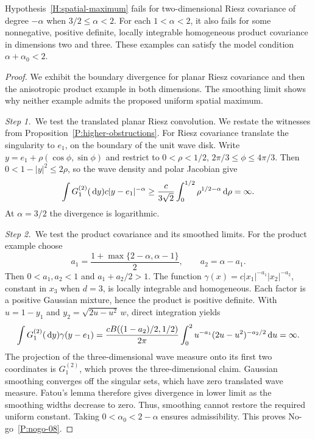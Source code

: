 \setcounter{nogo}{7}
\begin{nogo}\label{P:nogo-08}
  Hypothesis~\ref{H:spatial-maximum} fails for two-dimensional Riesz
  covariance of degree $-\alpha$ when $3/2\le\alpha<2$. For each
  $1<\alpha<2$, it also fails for some nonnegative, positive definite,
  locally integrable homogeneous product covariance in dimensions two
  and three. These examples can satisfy the model condition
  $\alpha+\alpha_0<2$.
\end{nogo}
\begin{proof}
  We exhibit the boundary divergence for planar Riesz covariance and then the
  anisotropic product example in both dimensions. The smoothing limit shows
  why neither example admits the proposed uniform spatial maximum.


  \medskip
  \noindent\textit{Step 1.~}We test the translated planar Riesz convolution.
  We restate the witnesses from Proposition~\ref{P:higher-obstructions}.
  For Riesz covariance translate the singularity to $e_1$, on the boundary
  of the unit wave disk. Write $y=e_1+\rho(\cos\phi,\sin\phi)$ and restrict
  to $0<\rho<1/2$, $2\pi/3\le\phi\le4\pi/3$. Then
  $0<1-|y|^2\le2\rho$, so the wave density and polar Jacobian give
  \[
    \int G_1^{(2)}(\,\mathrm{d} y)c|y-e_1|^{-\alpha}
    \ge \frac{c}{3\sqrt2}\int_0^{1/2}\rho^{1/2-\alpha}\,\mathrm{d}\rho
    =\infty.
  \]
  At $\alpha=3/2$ the divergence is logarithmic.


  \medskip
  \noindent\textit{Step 2.~}We test the product covariance and its smoothed
  limits.
  For the product example choose
  \[
    a_1=\frac{1+\max\{2-\alpha,\alpha-1\}}2,
    \qquad a_2=\alpha-a_1.
  \]
  Then $0<a_1,a_2<1$ and $a_1+a_2/2>1$. The function
  $\gamma(x)=c|x_1|^{-a_1}|x_2|^{-a_2}$, constant in $x_3$ when $d=3$,
  is locally integrable and homogeneous. Each factor is a positive
  Gaussian mixture, hence the product is positive definite. With
  $u=1-y_1$ and $y_2=\sqrt{2u-u^2}\,w$, direct integration yields
  \[
    \int G_1^{(2)}(\,\mathrm{d} y)\gamma(y-e_1)
    =\frac{c B((1-a_2)/2,1/2)}{2\pi}
    \int_0^2u^{-a_1}(2u-u^2)^{-a_2/2}\,\mathrm{d} u=\infty.
  \]
  The projection of the three-dimensional wave measure onto its first
  two coordinates is $G_1^{(2)}$, which proves the three-dimensional claim.
  Gaussian smoothing converges off the singular sets, which have zero
  translated wave measure. Fatou's lemma therefore gives divergence in
  lower limit as the smoothing widths decrease to zero. Thus, smoothing
  cannot restore the required uniform constant. Taking
  $0<\alpha_0<2-\alpha$ ensures admissibility.
  This proves No-go~\ref{P:nogo-08}.
\end{proof}

